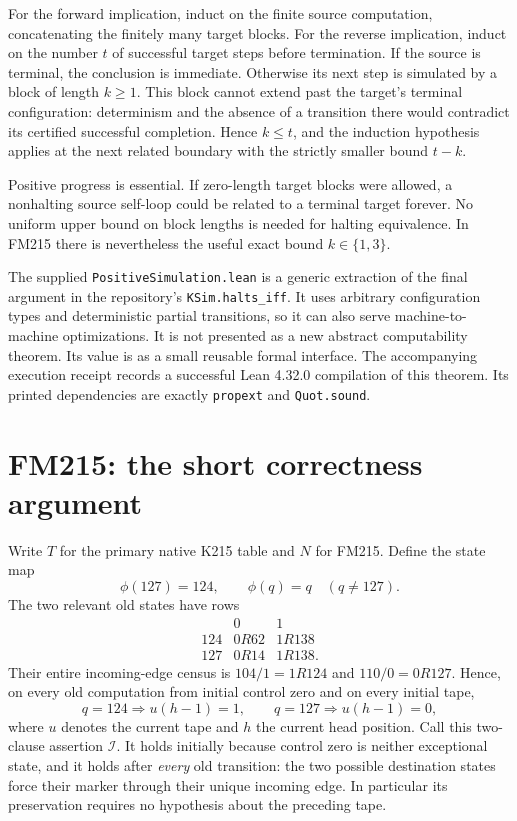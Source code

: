 For the forward implication, induct on the finite source computation,
concatenating the finitely many target blocks. For the reverse implication,
induct on the number $t$ of successful target steps before termination.
If the source is terminal, the conclusion is immediate. Otherwise its
next step is simulated by a block of length $k\geq1$. This block cannot
extend past the target's terminal configuration: determinism and the
absence of a transition there would contradict its certified successful
completion. Hence $k\leq t$, and the induction hypothesis applies at the
next related boundary with the strictly smaller bound $t-k$.

Positive progress is essential. If zero-length target blocks were
allowed, a nonhalting source self-loop could be related to a terminal
target forever. No uniform upper bound on block lengths is needed for
halting equivalence. In FM215 there is nevertheless the useful exact
bound $k\in\{1,3\}$.

The supplied \texttt{PositiveSimulation.lean} is a generic extraction of
the final argument in the repository's \texttt{KSim.halts\_iff}. It uses
arbitrary configuration types and deterministic partial transitions, so
it can also serve machine-to-machine optimizations. It is not presented
as a new abstract computability theorem. Its value is as a small reusable
formal interface. The accompanying execution receipt records a successful
Lean 4.32.0 compilation of this theorem. Its printed dependencies are
exactly \texttt{propext} and \texttt{Quot.sound}.

\section{FM215: the short correctness argument}
\label{sec:fm-proof}

Write $T$ for the primary native K215 table and $N$ for FM215. Define the
state map
\[
 \phi(127)=124,\qquad \phi(q)=q\quad(q\neq127).
\]
The two relevant old states have rows
\[
\begin{array}{c|cc}
 &0&1\\\hline
124&0R62&1R138\\
127&0R14&1R138.
\end{array}
\]
Their entire incoming-edge census is
$104/1=1R124$ and $110/0=0R127$. Hence, on every old computation from
initial control zero and on every initial tape,
\[
 q=124\Longrightarrow u(h-1)=1,\qquad
 q=127\Longrightarrow u(h-1)=0,
\]
where $u$ denotes the current tape and $h$ the current head position.
Call this two-clause assertion $\mathcal I$. It holds initially because control
zero is neither exceptional state, and it holds after \emph{every}
old transition: the two possible destination states force their marker
through their unique incoming edge. In particular its preservation
requires no hypothesis about the preceding tape.

